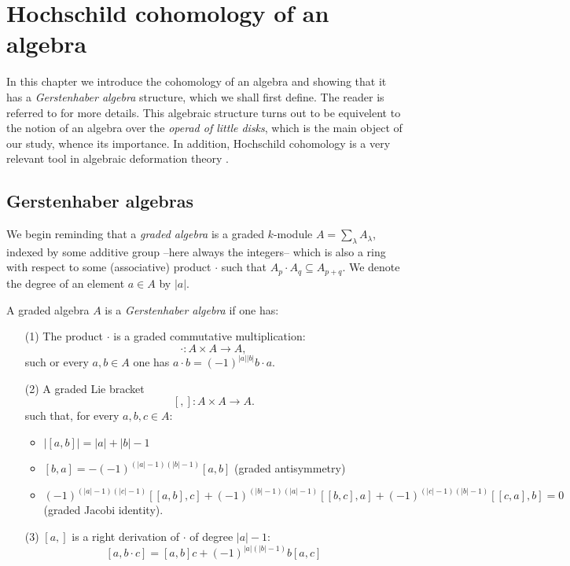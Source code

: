 \documentclass[TFM.tex]{subfiles}
\begin{document}
\chapter{Hochschild cohomology of an algebra}

In this chapter we introduce the cohomology of an algebra and showing that it has a \emph{Gerstenhaber algebra} structure, which we shall first define. The reader is referred to \cite{Gerstenhaber} for more details. This algebraic structure turns out to be equivelent to the notion of an algebra over the \emph{operad of little disks}, which is the main object of our study, whence its importance. In addition, Hochschild cohomology is a very relevant tool in algebraic deformation theory \cite{deformation}.


\section{Gerstenhaber algebras}

 We begin reminding that a \emph{graded algebra} is a graded $k$-module  $A=\sum_\lambda A_\lambda$, indexed by some additive group --here always the integers-- which is also a ring with respect to some (associative) product $\cdot$ such that $A_p\cdot A_q\subseteq A_{p+q}$. We denote the degree of an element $a\in A$ by $|a|$. %


\begin{defi}\label{defi1}
A graded algebra $A$ is a \emph{Gerstenhaber algebra} if one has:
\begin{enumerate}
\item[(1)] The product $\cdot$ is a graded commutative multiplication:
\[
\cdot: A\times A\to A,
\]
such or every $a,b\in A$ one has $a\cdot b=(-1)^{|a||b|}b\cdot a$.

\item[(2)] A graded Lie bracket 
\[
[,]:A\times A\to A.
\]
such that, for every $a,b,c\in A$:
\begin{itemize}
\item $|[a,b]|=|a|+|b|-1$
\item $[b,a]=-(-1)^{(|a|-1)(|b|-1)}[a,b]$ (graded antisymmetry)
\item $(-1)^{(|a|-1)(|c|-1)}[[a,b],c]+(-1)^{(|b|-1)(|a|-1)}[[b,c],a]+(-1)^{(|c|-1)(|b|-1)}[[c,a],b]=0$ (graded Jacobi identity). 
\end{itemize}
\item[(3)]  $[a,]$ is a right derivation of $\cdot$ of degree $|a|-1$:%
\[
[a,b\cdot c] = [a,b]c+(-1)^{|a|(|b|-1)}b[a,c]
\]
\end{enumerate}
\end{defi}
\end{document}
